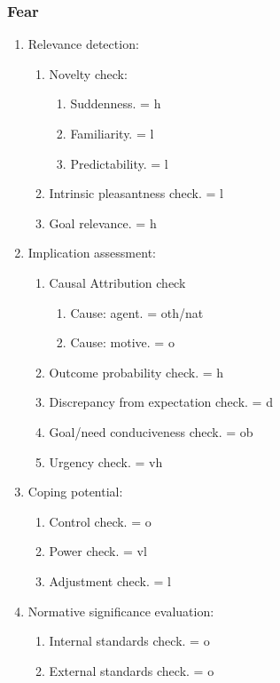 {{\subsubsection{Fear}

\begin{enumerate}
\item  Relevance detection:
\begin{enumerate}
\item  Novelty check:
\begin{enumerate}
\item  Suddenness. = h
\item  Familiarity. = l
\item  Predictability. = l
\end{enumerate}
\item  Intrinsic pleasantness check. = l
\item  Goal relevance. = h
\end{enumerate}
\item  Implication assessment:
\begin{enumerate}
\item  Causal Attribution check
\begin{enumerate}
\item  Cause: agent. = oth/nat
\item  Cause: motive. = o
\end{enumerate}
\item  Outcome probability check. = h
\item  Discrepancy from expectation check. = d
\item  Goal/need conduciveness check. = ob
\item  Urgency check. = vh
\end{enumerate}
\item  Coping potential:
\begin{enumerate}
\item  Control check. = o
\item  Power check. = vl
\item  Adjustment check. = l
\end{enumerate}
\item  Normative significance evaluation:
\begin{enumerate}
\item  Internal standards check. = o
\item  External standards check. = o
\end{enumerate}
\end{enumerate}

}}
